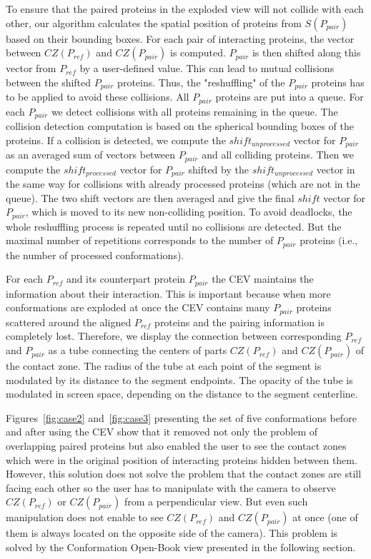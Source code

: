 \documentclass[journal]{vgtc}                %
\begin{document}
To ensure that the paired proteins in the exploded view will not collide with each other, our algorithm calculates the spatial position of proteins from $S(P_{pair})$ based on their bounding boxes.
For each pair of interacting proteins, the vector between $CZ(P_{ref})$ and $CZ(P_{pair})$ is computed. 
$P_{pair}$ is then shifted along this vector from $P_{ref}$ by a user-defined value. 
This can lead to mutual collisions between the shifted $P_{pair}$ proteins.
Thus, the "reshuffling" of the $P_{pair}$ proteins has to be applied to avoid these collisions. 
All $P_{pair}$ proteins are put into a queue.
For each $P_{pair}$ we detect collisions with all proteins remaining in the queue.
The collision detection computation is based on the spherical bounding boxes of the proteins.
If a collision is detected, we compute the $shift_{unprocessed}$ vector for $P_{pair}$ as an averaged sum of vectors between $P_{pair}$ and all colliding proteins.
Then we compute the $shift_{processed}$ vector for $P_{pair}$ shifted by the $shift_{unprocessed}$ vector in the same way for collisions with already processed proteins (which are not in the queue).
The two shift vectors are then averaged and give the final $shift$ vector for $P_{pair}$, which is moved to its new non-colliding position.
To avoid deadlocks, the whole reshuffling process is repeated until no collisions are detected.
But the maximal number of repetitions corresponds to the number of $P_{pair}$ proteins (i.e., the number of processed conformations).

For each $P_{ref}$ and its counterpart protein $P_{pair}$ the CEV maintains the information about their interaction.
This is important because when more conformations are exploded at once the CEV contains many $P_{pair}$ proteins scattered around the aligned $P_{ref}$ proteins and the pairing information is completely lost.
Therefore, we display the connection between corresponding $P_{ref}$ and $P_{pair}$ as a tube connecting the centers of parts $CZ(P_{ref})$ and $CZ(P_{pair})$ of the contact zone.
The radius of the tube at each point of the segment is modulated by its distance to the segment endpoints.
The opacity of the tube is modulated in screen space, depending on the distance to the segment centerline.

Figures~\ref{fig:case2} and~\ref{fig:case3} presenting the set of five conformations before and after using the CEV show that it removed not only the problem of overlapping paired proteins but also enabled the user to see the contact zones which were in the original position of interacting proteins hidden between them.
However, this solution does not solve the problem that the contact zones are still facing each other so the user has to manipulate with the camera to observe $CZ(P_{ref})$ or $CZ(P_{pair})$ from a perpendicular view. 
But even such manipulation does not enable to see $CZ(P_{ref})$ and $CZ(P_{pair})$ at once (one of them is always located on the opposite side of the camera).
This problem is solved by the Conformation Open-Book view presented in the following section.
\end{document}
